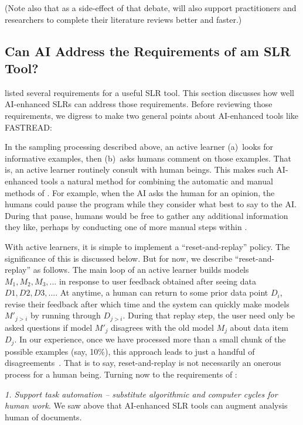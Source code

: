 (Note also that as a side-effect of that debate,
{\IT} will also support  practitioners and  researchers to complete their literature reviews better and faster.)
\vspace{8pt}

\subsection{Can AI Address the Requirements of am SLR Tool?}\label{tion:canai}
\noindent

 listed several requirements for a useful SLR tool. This section discusses how well
AI-enhanced SLRs can address
those requirements.
Before reviewing those requirements, we digress to make two general points about  AI-enhanced tools like FASTREAD:
\bi
\item
In the sampling processing described above, an active learner (a)~looks for informative examples, then (b)~asks humans comment on those examples. That is, an active learner  routinely  consult with  human beings. This makes such AI-enhanced tools a natural method for combining the automatic and manual methods of . For example, when the AI asks the human for an
opinion, the humans could pause the program while they consider what best to say to the AI. During that pause, humans would be free
to gather any additional information they like, perhaps by conducting one of more manual steps within .
\item
With active learners,  it is simple to implement a ``reset-and-replay'' policy.
The significance of this is discussed below. But for now, we describe ``reset-and-replay'' as
follows.
The main loop of an active learner builds models $M_1, M_2, M_3,...$ in response to user
feedback obtained after seeing data $D1, D2, D3,...$.
At anytime, a human can return to some prior data point $D_i$, revise their feedback 
after which time and the system can
quickly make models $M'_{j>i}$ by running  through $D_{j>i}$. During that replay step, the user need only be asked
questions 
if model $M'_j$ disagrees with the  old model $M_j$ about data item $D_j$. In our experience, once we have processed more than a small
chunk of the possible examples (say, 10\%), this approach leads to just a handful of disagreements~\cite{Yu20}. That is to say, reset-and-replay is not necessarily an onerous  process for a human being.
\ei
Turning now to the requirements of :

{\em 1. Support task automation -- substitute algorithmic and computer cycles for human work}. We saw above that AI-enhanced SLR tools can augment analysis human of documents.

